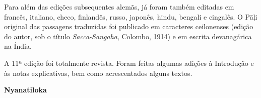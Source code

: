 Para além das edições subsequentes alemãs, já foram também editadas em francês, italiano, checo, finlandês, russo, japonês, hindu, bengali e cingalês. O Pāḷi original das passagens traduzidas foi publicado em caracteres ceilonenses (edição do autor, sob o título \emph{Sacca-Sangaha}, Colombo, 1914) e em escrita devanagárica na Índia.

A 11ª edição foi totalmente revista. Foram feitas algumas adições à Introdução e às notas explicativas, bem como acrescentados alguns textos.

\textbf{Nyanatiloka}

